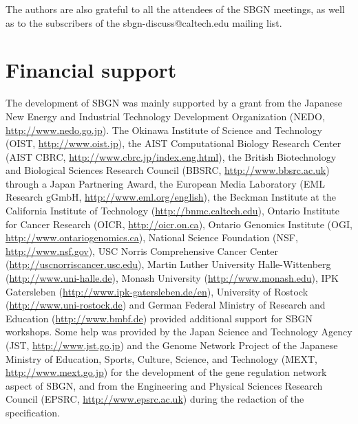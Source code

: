 The authors are also grateful to all the attendees of the SBGN meetings, as well as to the subscribers of the sbgn-discuss@caltech.edu mailing list.

\section{Financial support}

The development of SBGN was mainly supported by a grant from the Japanese New Energy and Industrial Technology Development Organization (NEDO, \url{http://www.nedo.go.jp}). 
The Okinawa Institute of Science and Technology (OIST, \url{http://www.oist.jp}), 
the AIST Computational Biology Research Center (AIST CBRC, \url{http://www.cbrc.jp/index.eng.html}), 
the British Biotechnology and Biological Sciences Research Council (BBSRC, \url{http://www.bbsrc.ac.uk}) through a Japan Partnering Award, 
the European Media Laboratory (EML Research gGmbH, \url{http://www.eml.org/english}), 
the Beckman Institute at the California Institute of Technology (\url{http://bnmc.caltech.edu}), 
Ontario Institute for Cancer Research (OICR, \url{http://oicr.on.ca}), 
Ontario Genomics Institute (OGI, \url{http://www.ontariogenomics.ca}), 
National Science Foundation (NSF, \url{http://www.nsf.gov}), 
USC Norris Comprehensive Cancer Center (\url{http://uscnorriscancer.usc.edu}), 
Martin Luther University Halle-Wittenberg (\url{http://www.uni-halle.de}), 
Monash University (\url{http://www.monash.edu}), 
IPK Gatersleben (\url{http://www.ipk-gatersleben.de/en}), 
University of Rostock (\url{http://www.uni-rostock.de})  and 
German Federal Ministry of Research and Education (\url{http://www.bmbf.de}) provided additional support for SBGN workshops. 
Some help was provided by the Japan Science and Technology Agency (JST, \url{http://www.jst.go.jp}) and the Genome Network Project of the Japanese Ministry of Education, Sports, Culture, Science, and Technology (MEXT, \url{http://www.mext.go.jp}) for the development of the gene regulation network aspect of SBGN, and from the Engineering and Physical Sciences Research Council (EPSRC, \url{http://www.epsrc.ac.uk}) during the redaction of the specification.

